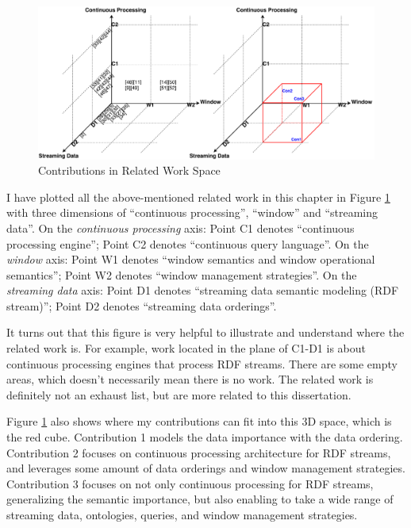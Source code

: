 \begin{figure}[!htbp]
	\centering
    \includegraphics[width=5in]{img/2-rwc.pdf}
    \caption{Contributions in Related Work Space}
    \label{fig:2-rwc}
\end{figure}

I have plotted all the above-mentioned related work in this chapter in Figure \ref{fig:2-rwc} with three dimensions of  ``continuous processing'', ``window'' and ``streaming data''.
On the \textit{continuous processing} axis: 
Point C1 denotes ``continuous processing engine'';
Point C2 denotes ``continuous query language''.
On the \textit{window} axis:
Point W1 denotes ``window semantics and window operational semantics'';
Point W2 denotes ``window management strategies''.
On the \textit{streaming data} axis:
Point D1 denotes ``streaming data semantic modeling (RDF stream)'';
Point D2 denotes ``streaming data orderings''.

It turns out that this figure is very helpful to illustrate and understand where the related work is. 
For example, work located in the plane of C1-D1 is about continuous processing engines that process RDF streams. 
There are some empty areas, which doesn't necessarily mean there is no work. 
The related work is definitely not an exhaust list, but are more related to this dissertation. 

Figure \ref{fig:2-rwc} also shows where my contributions can fit into this 3D space, which is the red cube. 
Contribution 1 models the data importance with the data ordering.
Contribution 2 focuses on continuous processing architecture for RDF streams, and leverages some amount of data orderings and window management strategies. 
Contribution 3 focuses on not only continuous processing for RDF streams, generalizing the semantic importance, but also enabling to take a wide range of streaming data, ontologies, queries, and window management strategies.